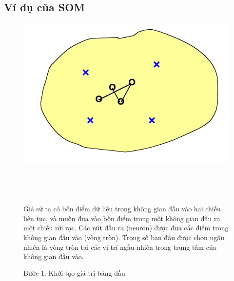\subsection{Ví dụ của SOM}
\begin{figure}[h!]
  \begin{minipage}{0.4\textwidth}
	\centering
    \includegraphics[width=1\textwidth,keepaspectratio=true]{SOM6.png}
    \caption{Bước 1: Khởi tạo giá trị bảng đầu}
  \end{minipage}
  ~
  \begin{minipage}{0.1\textwidth}
  \end{minipage}
  ~
  \begin{minipage}{0.5\textwidth}
  Giả sử ta có bốn điểm dữ liệu trong không gian đầu vào hai chiều liên tục, và muốn đưa vào bốn điểm trong một không gian đầu ra một chiều rời rạc. Các nút đầu ra (neuron) được đưa các điểm trong không gian đầu vào (vòng tròn). Trọng số ban đầu được chọn ngẫu nhiên là vòng tròn tại các vị trí ngẫu nhiên trong trung tâm của không gian đầu vào. 
  \end{minipage}
\end{figure}
